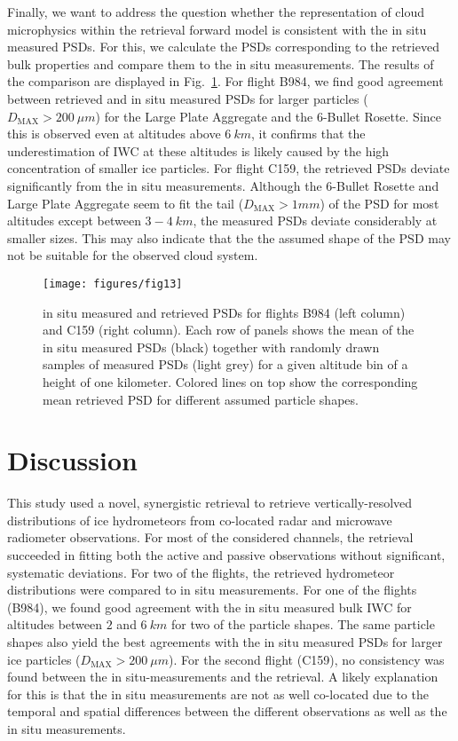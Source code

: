 \documentclass[journal abbreviation, manuscript]{copernicus}
\begin{document}
Finally, we want to address the question whether the representation of cloud
microphysics within the retrieval forward model is consistent with the in situ
measured PSDs. For this, we calculate the PSDs corresponding to the retrieved
bulk properties and compare them to the in situ measurements. The results of the
comparison are displayed in Fig.~\ref{fig:in_situ_psds}. For flight B984, we
find good agreement between retrieved and in situ measured PSDs for larger
particles ($D_\text{MAX} > 200 \ \unit{\mu m}$) for the Large Plate Aggregate
and the 6-Bullet Rosette. Since this is observed even at altitudes above $6
\ \unit{km}$, it confirms that the underestimation of IWC at these altitudes is
likely caused by the high concentration of smaller ice particles. For flight
C159, the retrieved PSDs deviate significantly from the in situ measurements.
Although the 6-Bullet Rosette and Large Plate Aggregate seem to fit the tail
($D_\text{MAX} > 1 \unit{mm}$) of the PSD for most altitudes except between $3 -
4\ \unit{km}$, the measured PSDs deviate considerably at smaller sizes. This may
also indicate that the the assumed shape of the PSD may not be suitable for the
observed cloud system.

\begin{figure}[!hbpt]
  \centering
  \texttt{[image: figures/fig13]}
  \caption{in situ measured and retrieved PSDs for flights B984 (left column)
    and C159 (right column). Each row of panels shows the mean of the
    in situ measured PSDs (black) together with randomly drawn samples of
    measured PSDs (light grey) for a given altitude bin of a height of one
    kilometer. Colored lines on top show the corresponding mean retrieved PSD
    for different assumed particle shapes.}
  \label{fig:in_situ_psds}
\end{figure}

\section{Discussion}
\label{sec:discussion}

This study used a novel, synergistic retrieval to retrieve vertically-resolved
distributions of ice hydrometeors from co-located radar and microwave radiometer
observations. For most of the considered channels, the retrieval succeeded in
fitting both the active and passive observations without significant, systematic
deviations. For two of the flights, the retrieved hydrometeor distributions were
compared to in situ measurements. For one of the flights (B984), we found good
agreement with the in situ measured bulk IWC for altitudes between $2$ and
$6\ \unit{km}$ for two of the particle shapes. The same particle shapes also
yield the best agreements with the in situ measured PSDs for larger ice
particles ($D_\text{MAX} > 200\ \unit{\mu m}$). For the second flight (C159), no
consistency was found between the in situ-measurements and the retrieval. A
likely explanation for this is that the in situ measurements are not as well
co-located due to the temporal and spatial differences between the different
observations as well as the in situ measurements.
\end{document}
